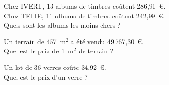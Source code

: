 \begin{myenumerate}
\item Chez IVERT, 13 albums de timbres coûtent 286,91~\textgreek{\euro}.\\Chez TELIE, 11 albums de timbres coûtent 242,99~\textgreek{\euro}.\\Quels sont les albums les moins chers ?
\item Un terrain de 457~m$^2$ a été vendu 49\,767,30~\textgreek{\euro}.\\Quel est le prix de 1~m$^2$ de terrain ?
\item Un lot de 36 verres coûte 34,92~\textgreek{\euro}.\\Quel est le prix d'un verre ?
\end{myenumerate}
